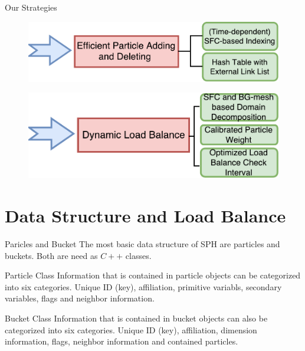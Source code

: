 \documentclass{beamer}
\begin{document}
\begin{frame}{Our Strategies}
\begin{figure}
\flushleft
\includegraphics[scale=0.5]{P_add_del}
\label{fig:P_add_del}
\end{figure}
%
\begin{figure}
\flushleft
\includegraphics[scale=0.5]{Load_balance}
\label{fig:Requirements}
\end{figure}
\end{frame}

\section{Data Structure and Load Balance}
\begin{frame}{Paricles and Bucket}
The most basic data structure of SPH are particles and buckets. Both are need as $C++$ classes.
\begin{block}{Particle Class}
Information that is contained in particle objects can be categorized into six categories.
Unique ID (key), affiliation, primitive variabls, secondary variables, flags and neighbor information.
\end{block}
\begin{block}{Bucket Class}
Information that is contained in bucket objects can also be categorized into six categories.
Unique ID (key), affiliation, dimension information, flags, neighbor information and contained particles.
\end{block}
\end{frame}
\end{document}
